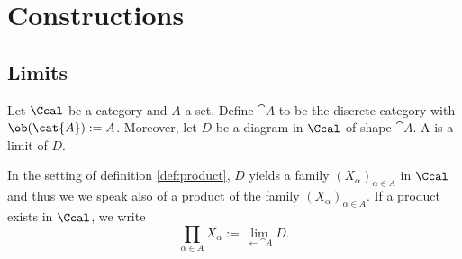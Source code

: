 \chapter{Constructions}
\section{Limits}



\begin{definition}[Product]
	Let $\Ccal$ be a category and $A$ a set. Define $\cat{A}$ to be the discrete category with $\ob(\cat{A}) := A$. Moreover, let $D$ be a diagram in $\Ccal$ of shape $\cat{A}$. A  is a limit of $D$. 
	\label{def:product}
\end{definition}

\begin{remark}
	In the setting of definition \ref{def:product}, $D$ yields a family $(X_\alpha)_{\alpha \in A}$ in $\Ccal$ and thus we we speak also of a product of the family $(X_\alpha)_{\alpha \in A}$. If a product exists in $\Ccal$, we write
	\begin{equation}
		\prod_{\alpha \in A} X_\alpha := \lim_{\leftarrow \cat{A}} D.
	\end{equation}
\end{remark}

